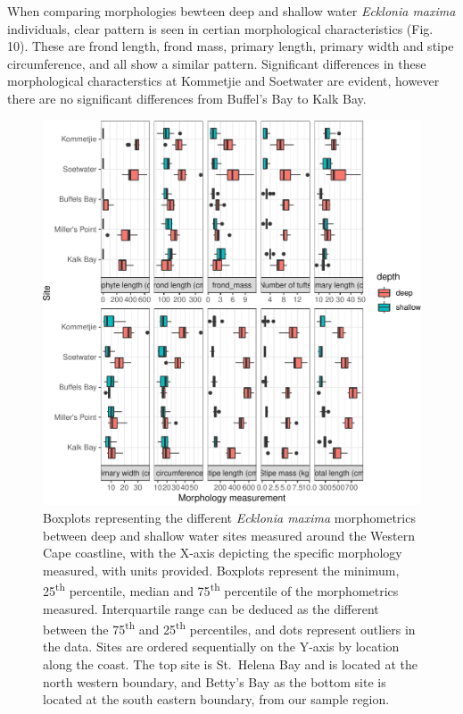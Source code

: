 \documentclass[10pt,a4,]{article}
\makeatletter
\def\maxwidth{\ifdim\Gin@nat@width>\linewidth\linewidth
\else\Gin@nat@width\fi}
\let\Oldincludegraphics\includegraphics
\renewcommand{\includegraphics}[1]{\Oldincludegraphics[width=\maxwidth]{#1}}
\makeatother
\begin{document}
When comparing morphologies bewteen deep and shallow water
\emph{Ecklonia maxima} individuals, clear pattern is seen in certian
morphological characteristics (Fig. 10). These are frond length, frond
mass, primary length, primary width and stipe circumference, and all
show a similar pattern. Significant differences in these morphological
characterstics at Kommetjie and Soetwater are evident, however there are
no significant differences from Buffel's Bay to Kalk Bay.

\begin{figure}
\centering
\includegraphics{chapter_2_files/figure-latex/unnamed-chunk-19-1.pdf}
\caption{Boxplots representing the different \emph{Ecklonia maxima}
morphometrics between deep and shallow water sites measured around the
Western Cape coastline, with the X-axis depicting the specific
morphology measured, with units provided. Boxplots represent the
minimum, 25\textsuperscript{th} percentile, median and
75\textsuperscript{th} percentile of the morphometrics measured.
Interquartile range can be deduced as the different between the
75\textsuperscript{th} and 25\textsuperscript{th} percentiles, and dots
represent outliers in the data. Sites are ordered sequentially on the
Y-axis by location along the coast. The top site is St.~Helena Bay and
is located at the north western boundary, and Betty's Bay as the bottom
site is located at the south eastern boundary, from our sample region.}
\end{figure}
\end{document}
